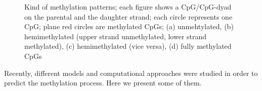 \begin{figure}[h]
\begin{subfigure}{.5\textwidth}
\centering
{}
\caption{}
\label{fig:sfig0}
\end{subfigure}%
\begin{subfigure}{.5\textwidth}
\centering
{}
  \caption{}
  \label{fig:sfig1}
\end{subfigure}
\begin{subfigure}{.5\textwidth}
\centering
{}
  \caption{}
  \label{fig:sfig2}
\end{subfigure}
\begin{subfigure}{.5\textwidth}
\centering
{}
  \caption{}
  \label{fig:sfig3}
\end{subfigure}
\caption{Kind of methylation patterns; each figure shows a CpG/CpG-dyad on the parental and the daughter strand; each circle represents one CpG; plane red circles are methylated CpGs; (a) unmehtylated, (b) hemimethylated (upper strand unmethylated, lower strand methylated), (c) hemimethylated (vice versa), (d) fully methylated CpGs}
\label{fig:methylationpatterns}
\end{figure}

Recently, different models and computational approaches were studied in order to predict the methylation process. Here we present some of them.\\

